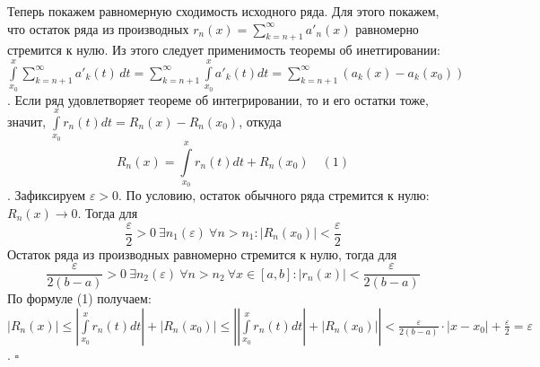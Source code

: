 Теперь покажем равномерную сходимость исходного ряда. 
Для этого покажем, что остаток 
ряда из производных $r_n(x)=\sum\limits_{k=n+1}^{\infty} a'_n(x)$
равномерно стремится к нулю. 
Из этого следует применимость теоремы об инетгировании: 
$\int\limits_{x_0}^{x}\sum\limits_{k=n+1}^{\infty} a'_k(t)\,dt=
\sum\limits_{k=n+1}^{\infty} \int\limits_{x_0}^{x} a'_k(t)dt=
\sum\limits_{k=n+1}^{\infty} (a_k(x)-a_k(x_0))$. Если ряд удовлетворяет 
теореме об интегрировании, то и его остатки тоже, значит,
$\int\limits_{x_0}^{x} r_n(t)dt=R_n(x)-R_n(x_0)$, откуда
$$R_n(x)=\int\limits_{x_0}^{x} r_n(t)dt+R_n(x_0)\quad(1)$$.
Зафиксируем $\varepsilon>0$. По условию, остаток обычного ряда стремится
к нулю: $R_n(x)\to0$. Тогда для 
$$\frac{\varepsilon}{2}>0~\exists n_1
(\varepsilon)~\forall n>n_1:|R_n(x_0)|<\frac{\varepsilon}{2}$$
Остаток ряда из производных равномерно стремится к нулю, тогда
для 
$$\frac{\varepsilon}{2(b-a)}>0~\exists n_2(\varepsilon)~\forall n>n_2~
\forall x\in[a,b]:|r_n(x)|<\frac{\varepsilon}{2(b-a)}$$
По формуле (1) получаем: 
$|R_n(x)|\leqslant \left| \int\limits_{x_0}^{x} r_n(t)dt \right|+
|R_n(x_0)|\leqslant \left|\left| \int\limits_{x_0}^{x} r_n(t)dt \right|+
|R_n(x_0)| \right|<\frac{\varepsilon}{2(b-a)}\cdot |x-x_0|+
\frac{\varepsilon}{2}=\varepsilon$. $\square$ 


